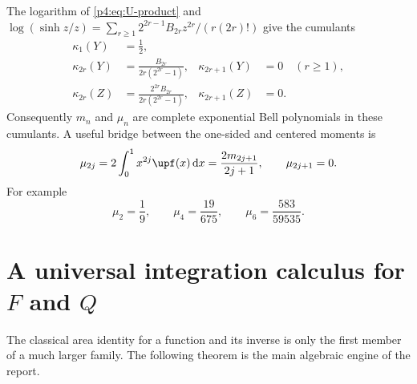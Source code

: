 \documentclass[11pt,oneside]{article}
\theoremstyle{definition}
\theoremstyle{remark}
\newcommand{\F}{F}
\newcommand{\Q}{Q}
\newcommand{\dd}{\,\mathrm d}
\newcommand{\1}{\mathbf 1}
\begin{document}
The logarithm of \cref{p4:eq:U-product} and
\(
 \log(\sinh z/z)
 =\sum_{r\ge1}2^{2r-1}B_{2r}z^{2r}/(r(2r)!)
\)
give the cumulants
\begin{align}
 \kappa_1(Y)&=\frac12,\nonumber\\
 \kappa_{2r}(Y)&=\frac{B_{2r}}{2r(2^{2r}-1)},
 &\kappa_{2r+1}(Y)&=0\quad(r\ge1),\label{p4:eq:Y-cumulants}\\
 \kappa_{2r}(Z)&=\frac{2^{2r}B_{2r}}{2r(2^{2r}-1)},
 &\kappa_{2r+1}(Z)&=0.\label{p4:eq:Z-cumulants}
\end{align}
Consequently \(m_n\) and \(\mu_n\) are complete exponential Bell polynomials in
these cumulants.  A useful bridge between the one-sided and centered moments is
\begin{equation}\label{p4:eq:mu-m-relation}
 \mu_{2j}
 =2\int_0^1x^{2j}\upf(x)\dd x
 =\frac{2m_{2j+1}}{2j+1},
 \qquad \mu_{2j+1}=0.
\end{equation}
For example
\begin{equation}\label{p4:eq:first-central-moments}
 \mu_2=\frac19,\qquad
 \mu_4=\frac{19}{675},\qquad
 \mu_6=\frac{583}{59535}.
\end{equation}

\section{A universal integration calculus for \texorpdfstring{\(\F\)}{F} and
\texorpdfstring{\(\Q\)}{Q}}

The classical area identity for a function and its inverse is only the first member of
a much larger family.  The following theorem is the main algebraic engine of the report.
\end{document}
